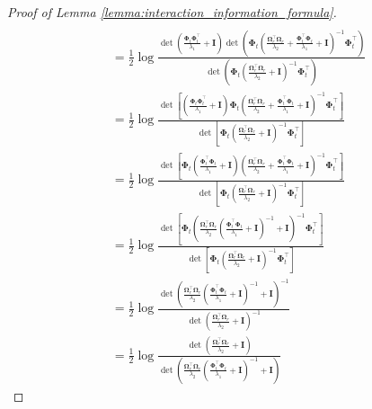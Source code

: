 \begin{proof}[Proof of Lemma \ref{lemma:interaction_information_formula}]
\begin{align}
\\
        & = \frac{1}{2}\log \frac{ \det (\frac{\boldsymbol{\Phi}_t\boldsymbol{\Phi}_t^\top}{\lambda_1} +\mathbf{I})
        \det(\boldsymbol{\Phi}_t \left(\frac{\boldsymbol{\Omega}_r^\top\boldsymbol{\Omega}_r}{\lambda_2}+\frac{\boldsymbol{\Phi}_t^\top \boldsymbol{\Phi}_t} {\lambda_1} + \mathbf{I}\right)^{-1} \boldsymbol{\Phi}_t^\top)
        }{\det(\boldsymbol{\Phi}_t \left(\frac{\boldsymbol{\Omega}_r^\top \boldsymbol{\Omega}_r}{\lambda_2} + \mathbf{I}\right)^{-1} \boldsymbol{\Phi}_t^\top)}  \nonumber
\\ 
        & = \frac{1}{2}\log \frac{\det[\left(\frac{\boldsymbol{\Phi}_t\boldsymbol{\Phi}_t^\top}{\lambda_1} +\mathbf{I}\right) \boldsymbol{\Phi}_t \left(\frac{\boldsymbol{\Omega}_r^\top\boldsymbol{\Omega}_r}{\lambda_2}+\frac{\boldsymbol{\Phi}_t^\top \boldsymbol{\Phi}_t} {\lambda_1} + \mathbf{I}\right)^{-1}\boldsymbol{\Phi}_t^\top]}
        {\det[ \boldsymbol{\Phi}_t \left(\frac{\boldsymbol{\Omega}_r^\top \boldsymbol{\Omega}_r}{\lambda_2} + \mathbf{I}\right)^{-1} \boldsymbol{\Phi}_t^\top]} \nonumber
\\ 
        & = \frac{1}{2}\log \frac{
        \det[\boldsymbol{\Phi}_t \left(\frac{\boldsymbol{\Phi}_t^\top\boldsymbol{\Phi}_t}{\lambda_1} +\mathbf{I}\right)  \left(\frac{\boldsymbol{\Omega}_r^\top\boldsymbol{\Omega}_r}{\lambda_2}+\frac{\boldsymbol{\Phi}_t^\top \boldsymbol{\Phi}_t} {\lambda_1} + \mathbf{I}\right)^{-1}\boldsymbol{\Phi}_t^\top]}
        {\det[ \boldsymbol{\Phi}_t \left(\frac{\boldsymbol{\Omega}_r^\top \boldsymbol{\Omega}_r}{\lambda_2} + \mathbf{I}\right)^{-1} \boldsymbol{\Phi}_t^\top]} \nonumber
\\
        & = \frac{1}{2}\log \frac{
        \det[\boldsymbol{\Phi}_t  \left(\frac{\boldsymbol{\Omega}_r^\top \boldsymbol{\Omega}_r}{\lambda_2} \left(\frac{\boldsymbol{\Phi}_t^\top\boldsymbol{\Phi}_t}{\lambda_1} +\mathbf{I}\right)^{-1} + \mathbf{I}\right)^{-1}\boldsymbol{\Phi}_t^\top]}
        {\det[ \boldsymbol{\Phi}_t \left(\frac{\boldsymbol{\Omega}_r^\top \boldsymbol{\Omega}_r}{\lambda_2} + \mathbf{I}\right)^{-1} \boldsymbol{\Phi}_t^\top]} \label{Eqn:det_division}
\\
        &= \frac{1}{2}\log \frac{\det\left(\frac{\boldsymbol{\Omega}_r^\top \boldsymbol{\Omega}_r}{\lambda_2} \left(\frac{\boldsymbol{\Phi}_t^\top\boldsymbol{\Phi}_t}{\lambda_1} +\mathbf{I}\right)^{-1} + \mathbf{I}\right)^{-1}}{\det (\frac{\boldsymbol{\Omega}_r^\top\boldsymbol{\Omega}_r}{\lambda_2} + \mathbf{I})^{-1}} \nonumber
\\
        & = \frac{1}{2}\log \frac{\det (\frac{\boldsymbol{\Omega}_r^\top\boldsymbol{\Omega}_r}{\lambda_2} + \mathbf{I})}{\det\left(\frac{\boldsymbol{\Omega}_r^\top \boldsymbol{\Omega}_r}{\lambda_2} \left(\frac{\boldsymbol{\Phi}_t^\top\boldsymbol{\Phi}_t}{\lambda_1} +\mathbf{I}\right)^{-1} + \mathbf{I}\right)} \nonumber

\end{align}
\end{proof}
